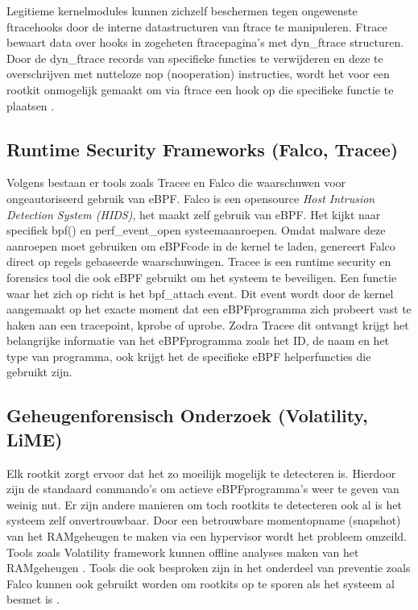 Legitieme kernelmodules kunnen zichzelf beschermen tegen ongewenste ftrace\-hooks door de interne datastructuren van ftrace te manipuleren. Ftrace bewaart data over hooks in zogeheten ftrace\-pagina's met dyn\_ftrace structuren. Door de dyn\_ftrace records van specifieke functies te verwijderen en deze te overschrijven met nutteloze nop (no\-operation) instructies, wordt het voor een rootkit onmogelijk gemaakt om via ftrace een hook op die specifieke functie te plaatsen \autocite{Apriorit2022}.

\subsection{Runtime Security Frameworks (Falco, Tracee)}
Volgens \textcite{Zaidenberg2024} bestaan er tools zoals Tracee en Falco die waarschuwen voor ongeautoriseerd gebruik van eBPF. Falco is een open\-source \emph{Host Intrusion Detection System (HIDS)}, het maakt zelf gebruik van eBPF. Het kijkt naar specifiek  bpf() en perf\_event\_open systeemaanroepen. Omdat malware deze aanroepen moet gebruiken om eBPF\-code in de kernel te laden, genereert Falco direct op regels gebaseerde waarschuwingen. Tracee is een runtime security en forensics tool die ook eBPF gebruikt om het systeem te beveiligen. Een functie waar het zich op richt is het bpf\_attach event. Dit event wordt door de kernel aangemaakt op het exacte moment dat een eBPF\-programma zich probeert vast te haken aan een tracepoint, kprobe of uprobe. Zodra Tracee dit ontvangt krijgt het belangrijke informatie van het eBPF\-programma zoals het ID, de naam en het type van programma, ook krijgt het de specifieke eBPF helper\-functies die gebruikt zijn. 

\subsection{Geheugenforensisch Onderzoek (Volatility, LiME)}
Elk rootkit zorgt ervoor dat het zo moeilijk mogelijk te detecteren is. Hierdoor zijn de standaard commando's om actieve eBPF\-programma's weer te geven van weinig nut. Er zijn andere manieren om toch rootkits te detecteren ook al is het systeem zelf onvertrouwbaar. Door een betrouwbare momentopname (snapshot) van het RAM\-geheugen te maken via een hypervisor wordt het probleem omzeild. Tools zoals Volatility framework kunnen offline analyses maken van het RAM\-geheugen \autocite{Zaidenberg2024}. Tools die ook besproken zijn in het onderdeel van preventie zoals Falco kunnen ook gebruikt worden om rootkits op te sporen als het systeem al besmet is \textcite {Windshock2025}.